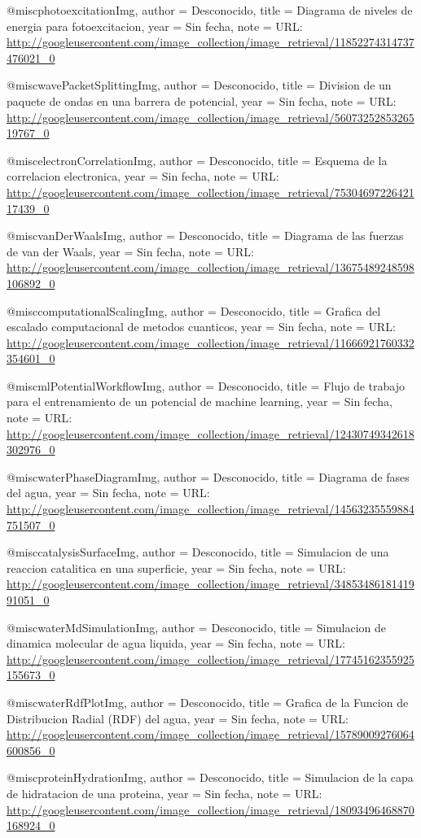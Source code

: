 @misc{photoexcitationImg,
  author = {{Desconocido}},
  title  = {Diagrama de niveles de energia para fotoexcitacion},
  year   = {{Sin fecha}},
  note   = {URL: \url{http://googleusercontent.com/image_collection/image_retrieval/11852274314737476021_0}}
}

@misc{wavePacketSplittingImg,
  author = {{Desconocido}},
  title  = {Division de un paquete de ondas en una barrera de potencial},
  year   = {{Sin fecha}},
  note   = {URL: \url{http://googleusercontent.com/image_collection/image_retrieval/5607325285326519767_0}}
}

@misc{electronCorrelationImg,
  author = {{Desconocido}},
  title  = {Esquema de la correlacion electronica},
  year   = {{Sin fecha}},
  note   = {URL: \url{http://googleusercontent.com/image_collection/image_retrieval/7530469722642117439_0}}
}

@misc{vanDerWaalsImg,
  author = {{Desconocido}},
  title  = {Diagrama de las fuerzas de van der Waals},
  year   = {{Sin fecha}},
  note   = {URL: \url{http://googleusercontent.com/image_collection/image_retrieval/13675489248598106892_0}}
}

@misc{computationalScalingImg,
  author = {{Desconocido}},
  title  = {Grafica del escalado computacional de metodos cuanticos},
  year   = {{Sin fecha}},
  note   = {URL: \url{http://googleusercontent.com/image_collection/image_retrieval/11666921760332354601_0}}
}

@misc{mlPotentialWorkflowImg,
  author = {{Desconocido}},
  title  = {Flujo de trabajo para el entrenamiento de un potencial de machine learning},
  year   = {{Sin fecha}},
  note   = {URL: \url{http://googleusercontent.com/image_collection/image_retrieval/12430749342618302976_0}}
}

@misc{waterPhaseDiagramImg,
  author = {{Desconocido}},
  title  = {Diagrama de fases del agua},
  year   = {{Sin fecha}},
  note   = {URL: \url{http://googleusercontent.com/image_collection/image_retrieval/14563235559884751507_0}}
}

@misc{catalysisSurfaceImg,
  author = {{Desconocido}},
  title  = {Simulacion de una reaccion catalitica en una superficie},
  year   = {{Sin fecha}},
  note   = {URL: \url{http://googleusercontent.com/image_collection/image_retrieval/3485348618141991051_0}}
}

@misc{waterMdSimulationImg,
  author = {{Desconocido}},
  title  = {Simulacion de dinamica molecular de agua liquida},
  year   = {{Sin fecha}},
  note   = {URL: \url{http://googleusercontent.com/image_collection/image_retrieval/17745162355925155673_0}}
}

@misc{waterRdfPlotImg,
  author = {{Desconocido}},
  title  = {Grafica de la Funcion de Distribucion Radial (RDF) del agua},
  year   = {{Sin fecha}},
  note   = {URL: \url{http://googleusercontent.com/image_collection/image_retrieval/15789009276064600856_0}}
}

@misc{proteinHydrationImg,
  author = {{Desconocido}},
  title  = {Simulacion de la capa de hidratacion de una proteina},
  year   = {{Sin fecha}},
  note   = {URL: \url{http://googleusercontent.com/image_collection/image_retrieval/18093496468870168924_0}}
}